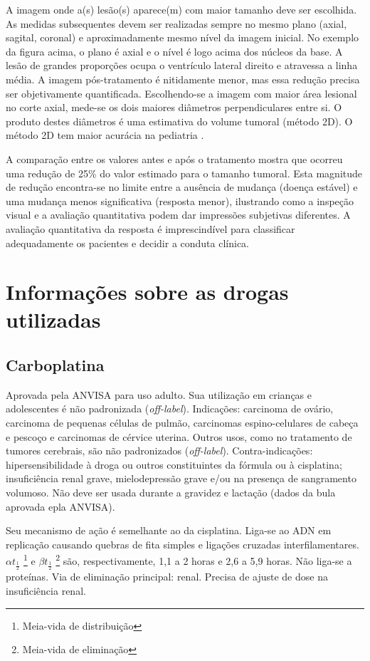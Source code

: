 \documentclass[11pt,a4paper,oldfontcommands]{memoir}
\begin{document}
A imagem onde a(s) lesão(s) aparece(m) com maior tamanho deve ser escolhida. As medidas subsequentes devem ser realizadas sempre no mesmo plano (axial, sagital, coronal) e aproximadamente mesmo nível da imagem inicial. No exemplo da figura acima, o plano é axial e o nível é logo acima dos núcleos da base. A lesão de grandes proporções ocupa o ventrículo lateral direito e atravessa a linha média. A imagem pós-tratamento é nitidamente menor, mas essa redução precisa ser objetivamente quantificada. Escolhendo-se a imagem com maior área lesional no corte axial, mede-se os dois maiores diâmetros perpendiculares entre si. O produto destes diâmetros é uma estimativa do volume tumoral (método 2D). O método 2D tem maior acurácia na pediatria \cite{warren}.

A comparação entre os valores antes e após o tratamento mostra que ocorreu uma redução de 25\% do valor estimado para o tamanho tumoral. Esta magnitude de redução encontra-se no limite entre a ausência de mudança (doença estável) e uma mudança menos significativa (resposta menor), ilustrando como a inspeção visual e a avaliação quantitativa podem dar impressões subjetivas diferentes. A avaliação quantitativa da resposta é imprescindível para classificar adequadamente os pacientes e decidir a conduta clínica.


\chapter{Informações sobre as drogas utilizadas}

\section{Carboplatina}

Aprovada pela ANVISA para uso adulto. Sua utilização em crianças e adolescentes é não padronizada (\textit{off-label}). Indicações: carcinoma de ovário, carcinoma de pequenas células de pulmão, carcinomas espino-celulares de cabeça e pescoço e carcinomas de cérvice uterina. Outros usos, como no tratamento de tumores cerebrais, são não padronizados (\textit{off-label}). Contra-indicações: hipersensibilidade à droga ou outros constituintes da fórmula ou à cisplatina; insuficiência renal grave, mielodepressão grave e/ou na presença de sangramento volumoso. Não deve ser usada durante a gravidez e lactação (dados da bula aprovada epla ANVISA).

Seu mecanismo de ação é semelhante ao da cisplatina. Liga-se ao ADN em replicação causando quebras de fita simples e ligações cruzadas interfilamentares. \(\alpha t_\frac{1}{2}\) \footnote{Meia-vida de distribuição} e \(\beta t_\frac{1}{2}\) \footnote{Meia-vida de eliminação} são, respectivamente, 1,1 a 2 horas e 2,6 a 5,9 horas. Não liga-se a proteínas. Via de eliminação principal: renal. Precisa de ajuste de dose na insuficiência renal.
\end{document}
